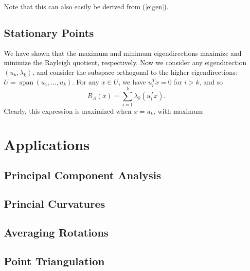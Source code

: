 \documentclass[reqno]{amsart}
\numberwithin{equation}{section}
\begin{document}
Note that this can also easily be derived from (\ref{eigen}).

\subsection{Stationary Points}

We have shown that the maximum and minimum eigendirections maximize and
minimize the Rayleigh quotient, respectively. Now we consider any
eigendirection $(u_k, \lambda_k)$, and consider the subspace
orthogonal to the higher eigendirections: $U = \operatorname{span}(u_1,
\ldots, u_k)$. For any $x \in U$, we have $u_i^T x = 0$ for $i > k$, and
so
$$
    R_A(x) = \sum_{i=1}^k \lambda_k (u_i^T x).
$$
Clearly, this expression is maximized when $x = u_k$, with maximum

\section{Applications}

\subsection{Principal Component Analysis}

\subsection{Princial Curvatures}

\subsection{Averaging Rotations}

\subsection{Point Triangulation}
\end{document}
